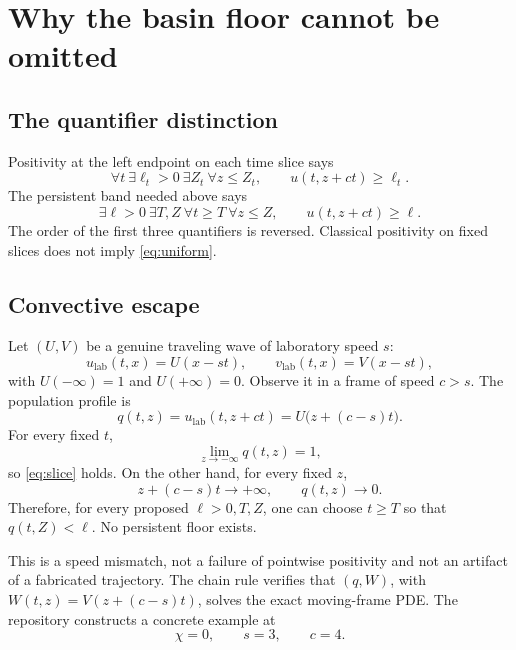 \documentclass[11pt]{article}
\begin{document}
\section{Why the basin floor cannot be omitted}

\subsection{The quantifier distinction}

Positivity at the left endpoint on each time slice says
\begin{equation}
 \forall t\ \exists\ell_t>0\ \exists Z_t\ \forall z\le Z_t,
 \qquad u(t,z+ct)\ge\ell_t.                             \label{eq:slice}
\end{equation}
The persistent band needed above says
\begin{equation}
 \exists\ell>0\ \exists T,Z\ \forall t\ge T\ \forall z\le Z,
 \qquad u(t,z+ct)\ge\ell.                              \label{eq:uniform}
\end{equation}
The order of the first three quantifiers is reversed.  Classical positivity
on fixed slices does not imply \eqref{eq:uniform}.

\subsection{Convective escape}

Let \((U,V)\) be a genuine traveling wave of laboratory speed \(s\):
\[
  u_{\mathrm{lab}}(t,x)=U(x-st),\qquad
  v_{\mathrm{lab}}(t,x)=V(x-st),
\]
with \(U(-\infty)=1\) and \(U(+\infty)=0\).  Observe it in a frame of speed
\(c>s\).  The population profile is
\begin{equation}
  q(t,z)=u_{\mathrm{lab}}(t,z+ct)
        =U\bigl(z+(c-s)t\bigr).                         \label{eq:escape}
\end{equation}
For every fixed \(t\),
\[
  \lim_{z\to-\infty}q(t,z)=1,
\]
so \eqref{eq:slice} holds.  On the other hand, for every fixed \(z\),
\[
  z+(c-s)t\longrightarrow+\infty,
  \qquad q(t,z)\longrightarrow0.
\]
Therefore, for every proposed \(\ell>0,T,Z\), one can choose \(t\ge T\)
so that \(q(t,Z)<\ell\).  No persistent floor exists.

This is a speed mismatch, not a failure of pointwise positivity and not an
artifact of a fabricated trajectory.  The chain rule verifies that
\((q,W)\), with \(W(t,z)=V(z+(c-s)t)\), solves the exact moving-frame PDE.
The repository constructs a concrete example at
\[
  \chi=0,\qquad s=3,\qquad c=4.
\]
\end{document}

